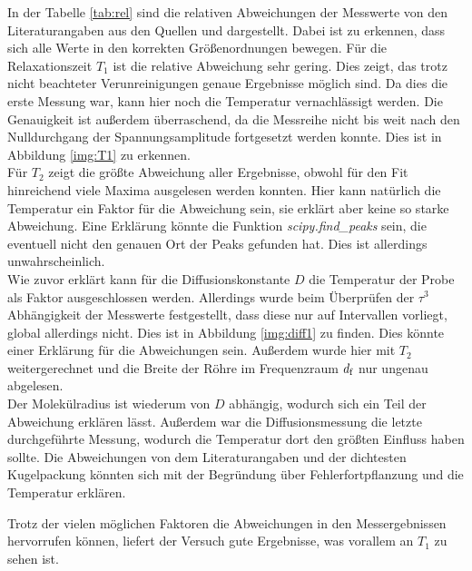 \noindent
In der Tabelle \ref{tab:rel} sind die relativen Abweichungen der Messwerte von den Literaturangaben aus den Quellen \cite{theo} und \cite{radius} dargestellt.
Dabei ist zu erkennen, dass sich alle Werte in den korrekten Größenordnungen bewegen. Für die Relaxationszeit $T_1$ ist die relative Abweichung sehr gering. 
Dies zeigt, das trotz nicht beachteter Verunreinigungen genaue Ergebnisse möglich sind. Da dies die erste Messung war, kann hier noch die Temperatur vernachlässigt werden. 
Die Genauigkeit ist außerdem überraschend, da die Messreihe nicht bis weit nach den Nulldurchgang der Spannungsamplitude fortgesetzt werden konnte. Dies ist in Abbildung \ref{img:T1} zu erkennen.\\
Für $T_2$ zeigt die größte Abweichung aller Ergebnisse, obwohl für den Fit hinreichend viele Maxima ausgelesen werden konnten. 
Hier kann natürlich die Temperatur ein Faktor für die Abweichung sein, sie erklärt aber keine so starke Abweichung. 
Eine Erklärung könnte die Funktion \textit{scipy.find\_peaks} sein, die eventuell nicht den genauen Ort der Peaks gefunden hat. Dies ist allerdings unwahrscheinlich.\\
Wie zuvor erklärt kann für die Diffusionskonstante $D$ die Temperatur der Probe als Faktor ausgeschlossen werden. 
Allerdings wurde beim Überprüfen der $\tau^3$ Abhängigkeit der Messwerte festgestellt, dass diese nur auf Intervallen vorliegt, global allerdings nicht.
Dies ist in Abbildung \ref{img:diff1} zu finden. Dies könnte einer Erklärung für die Abweichungen sein. Außerdem wurde hier mit $T_2$ weitergerechnet 
und die Breite der Röhre im Frequenzraum $d_{\text{f}}$ nur ungenau abgelesen.\\
Der Molekülradius ist wiederum von $D$ abhängig, wodurch sich ein Teil der Abweichung erklären lässt. 
Außerdem war die Diffusionsmessung die letzte durchgeführte Messung, wodurch die Temperatur dort den größten Einfluss haben sollte.
Die Abweichungen von dem Literaturangaben und der dichtesten Kugelpackung könnten sich mit der Begründung über Fehlerfortpflanzung und die Temperatur erklären.


\noindent
Trotz der vielen möglichen Faktoren die Abweichungen in den Messergebnissen hervorrufen können, liefert der Versuch gute Ergebnisse, was vorallem an $T_1$ zu sehen ist.
